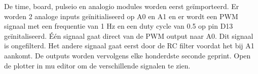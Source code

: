 	De time, board, pulseio en analogio modules worden eerst ge\"importeerd. Er worden 2 analoge inputs ge\"initialiseerd op A0 en A1 en er wordt een PWM signaal  met een frequentie van 1 Hz en een duty cycle van 0.5 op pin D13 ge\"initaliseerd. \'E\'en signaal gaat direct van de PWM output naar A0. Dit signaal is ongefilterd. Het andere signaal gaat eerst door de RC filter voordat het bij A1 aankomt. De outputs worden vervolgens elke honderdste seconde geprint. Open de plotter in mu editor om de verschillende signalen te zien.
	
	